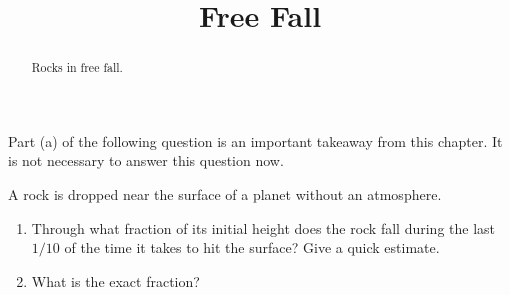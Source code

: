 \documentclass{ximera}
\title{Free Fall}
\begin{document}
\begin{abstract}
Rocks in free fall.
\end{abstract}
\maketitle


\begin{question} \label{Q54rghgeyghhg}

Part (a) of the following question is an important takeaway from this chapter. It is not necessary to answer this question now.

A rock is dropped near the surface of a planet without an atmosphere. 

\begin{enumerate}
\item Through what fraction of its initial height does the rock fall during the last $1/10$ of the time it takes to hit the surface? Give a quick estimate.

\item What is the exact fraction? 
\end{enumerate}
\end{question}
\end{document}

